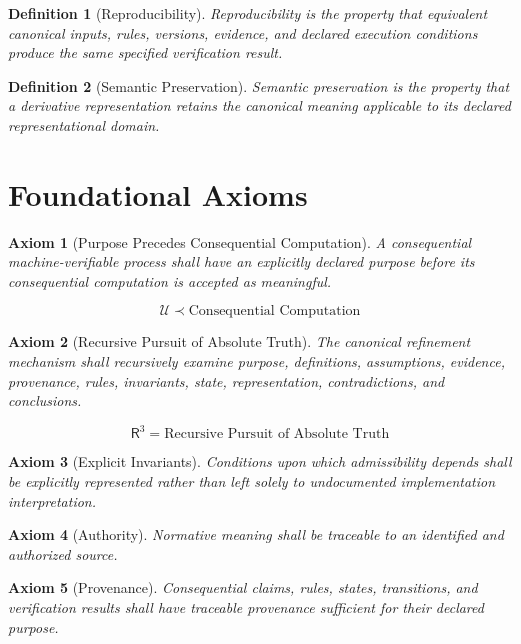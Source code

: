 \documentclass[11pt]{article}
\newcommand{\Rthree}{\ensuremath{\mathsf{R}^{3}}}
\newcommand{\Purpose}{\mathcal{U}}
\newtheorem{axiom}{Axiom}
\newtheorem{definition}{Definition}
\begin{document}
\begin{definition}[Reproducibility]
Reproducibility is the property that equivalent canonical inputs,
rules, versions, evidence, and declared execution conditions
produce the same specified verification result.
\end{definition}

\begin{definition}[Semantic Preservation]
Semantic preservation is the property that a derivative
representation retains the canonical meaning applicable to its
declared representational domain.
\end{definition}

\section{Foundational Axioms}

\begin{axiom}[Purpose Precedes Consequential Computation]
A consequential machine-verifiable process shall have an
explicitly declared purpose before its consequential computation
is accepted as meaningful.

\[
\boxed{
\Purpose \prec \text{Consequential Computation}
}
\]
\end{axiom}

\begin{axiom}[Recursive Pursuit of Absolute Truth]
The canonical refinement mechanism shall recursively examine
purpose, definitions, assumptions, evidence, provenance, rules,
invariants, state, representation, contradictions, and
conclusions.

\[
\boxed{
\Rthree{}=\text{Recursive Pursuit of Absolute Truth}
}
\]
\end{axiom}

\begin{axiom}[Explicit Invariants]
Conditions upon which admissibility depends shall be explicitly
represented rather than left solely to undocumented
implementation interpretation.
\end{axiom}

\begin{axiom}[Authority]
Normative meaning shall be traceable to an identified and
authorized source.
\end{axiom}

\begin{axiom}[Provenance]
Consequential claims, rules, states, transitions, and verification
results shall have traceable provenance sufficient for their
declared purpose.
\end{axiom}
\end{document}
